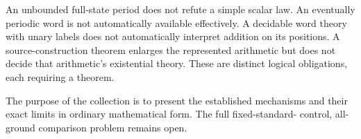 \documentclass[11pt,a4paper]{article}
\begin{document}
An unbounded full-state period does not refute a simple scalar law.  An
eventually periodic word is not automatically available effectively.  A
decidable word theory with unary labels does not automatically interpret
addition on its positions.  A source-construction theorem enlarges the
represented arithmetic but does not decide that arithmetic's existential
theory.  These are distinct logical obligations, each requiring a theorem.

The purpose of the collection is to present the established mechanisms and
their exact limits in ordinary mathematical form.  The full fixed-standard-
control, all-ground comparison problem remains open.

\appendix



\end{document}
